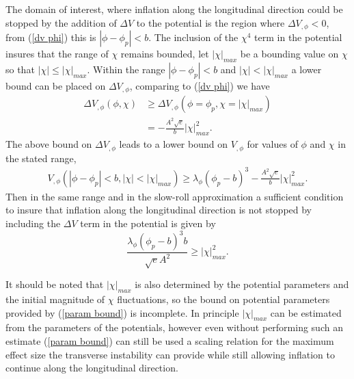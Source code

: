\documentclass[letterpaper,11pt]{article}
\begin{document}
The domain of interest, where inflation along the longitudinal direction could be stopped by the addition of $\Delta V$ to the potential is the region where $\Delta V_{,\phi} < 0$, from (\ref{dv phi}) this is $|\phi - \phi_p|<b$. The inclusion of the $\chi^4$ term in the potential insures that the range of $\chi$ remains bounded, let $|\chi|_{max}$ be a bounding value on $\chi$ so that $|\chi| \leq |\chi|_{max}$. Within the range $|\phi-\phi_p|<b$ and $|\chi|<|\chi|_{max}$ a lower bound can be placed on $\Delta V_{,\phi}$, comparing to (\ref{dv phi}) we have
\begin{align}
\Delta V_{,\phi}(\phi, \chi) &\geq \Delta V_{,\phi}(\phi=\phi_p, \chi=|\chi|_{max}) \\
&= -\frac{A^2\sqrt{e}}{b}|\chi|_{max}^2.
\end{align}
The above bound on $\Delta V_{,\phi}$ leads to a lower bound on $V_{,\phi}$ for values of $\phi$ and $\chi$ in the stated range,
\begin{align}
V_{,\phi}(|\phi-\phi_p|<b, |\chi|<|\chi|_{max}) \geq \lambda_{\phi}(\phi_p-b)^3 - \frac{A^2\sqrt{e}}{b}|\chi|_{max}^2.
\end{align}
Then in the same range and in the slow-roll approximation a sufficient condition to insure that inflation along the longitudinal direction is not stopped by including the $\Delta V$ term in the potential is given by
\begin{equation}
\frac{\lambda_{\phi}(\phi_p-b)^3b}{\sqrt{e}A^2} \geq |\chi|_{max}^2. \label{param bound}
\end{equation}

It should be noted that $|\chi|_{max}$ is also determined by the potential parameters and the initial magnitude of $\chi$ fluctuations, so the bound on potential parameters provided by (\ref{param bound}) is incomplete. In principle $|\chi|_{max}$ can be estimated from the parameters of the potentials, however even without performing such an estimate (\ref{param bound}) can still be used a scaling relation for the maximum effect size the transverse instability can provide while still allowing inflation to continue along the longitudinal direction.

\end{document}
